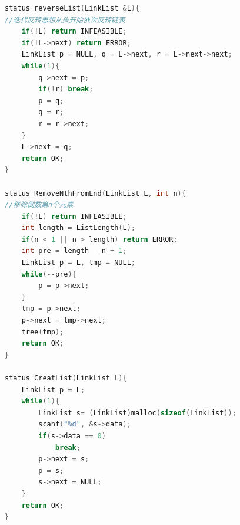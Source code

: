 \documentclass[supercite]{Experimental_Report}
\theoremstyle{definition}
\begin{document}
\begin{lstlisting}[language=c]
status reverseList(LinkList &L){
//迭代反转思想从头开始依次反转链表
    if(!L) return INFEASIBLE;
    if(!L->next) return ERROR;
    LinkList p = NULL, q = L->next, r = L->next->next;
    while(1){
        q->next = p;
        if(!r) break;
        p = q;
        q = r;
        r = r->next;
    }
    L->next = q;
    return OK;
}

status RemoveNthFromEnd(LinkList L, int n){
//移除倒数第n个元素 
    if(!L) return INFEASIBLE;
    int length = ListLength(L);
    if(n < 1 || n > length) return ERROR;
    int pre = length - n + 1;
    LinkList p = L, tmp = NULL;
    while(--pre){
        p = p->next;
    }
    tmp = p->next;
    p->next = tmp->next;
    free(tmp);
    return OK;
}

status CreatList(LinkList L){
	LinkList p = L;
	while(1){
		LinkList s= (LinkList)malloc(sizeof(LinkList));
		scanf("%d", &s->data);
		if(s->data == 0)
			break; 
		p->next = s;
		p = s;
		s->next = NULL;
	}
	return OK;
}


\end{lstlisting}
\end{document}
